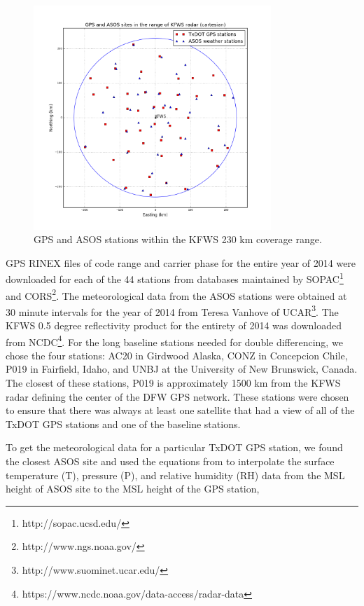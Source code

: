 \documentclass[proposal]{umassthesis}
\begin{document}
{\begin{figure}[!t]
\begin{center}
\includegraphics[width = 0.8\textwidth]{GPS_ASOS_Locations}
\caption{GPS and ASOS stations within the KFWS 230 km coverage range.}
\label{fig:GPS_ASOS_Loc}
\end{center}
\end{figure}

GPS RINEX files of code range and carrier phase for the entire year of 2014 were downloaded for each of the 44 stations from databases maintained by SOPAC\footnote{http://sopac.ucsd.edu/} \cite{bock1997scripps} and CORS\footnote{http://www.ngs.noaa.gov/}\cite{snay2008continuously}. The meteorological data from the ASOS stations were obtained at 30 minute intervals for the year of 2014 from Teresa Vanhove of UCAR\footnote{http://www.suominet.ucar.edu/}. The KFWS 0.5 degree reflectivity product for the entirety of 2014 was downloaded from NCDC\footnote{https://www.ncdc.noaa.gov/data-access/radar-data}. For the long baseline stations needed for double differencing, we chose the four stations: AC20 in Girdwood Alaska, CONZ in Concepcion Chile, P019 in Fairfield, Idaho, and UNBJ at the University of New Brunswick, Canada. The closest of these stations, P019 is approximately 1500 km from the KFWS radar defining the center of the DFW GPS network. These stations were chosen to ensure that there was always at least one satellite that had a view of all of the TxDOT GPS stations and one of the baseline stations.

To get the meteorological data for a particular TxDOT GPS station, we found the closest ASOS site and used the equations from \cite{bai2003gps} to interpolate the surface temperature (T), pressure (P), and relative humidity (RH) data from the MSL height of ASOS site to the MSL height of the GPS station,
 
}
\end{document}
